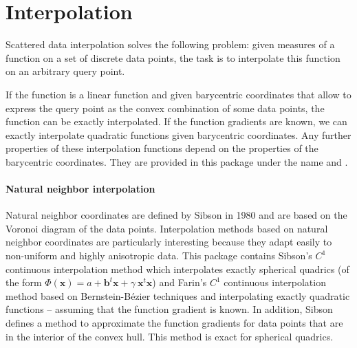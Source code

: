 
\chapter{Interpolation}
\label{chap:Interpolation}

Scattered data interpolation solves the following problem: given
measures of a function on a set of discrete data points, the task is
to interpolate this function on an arbitrary query point.

If the function is a linear function and given barycentric coordinates
that allow to express the query point as the convex combination of
some data points, the function can be exactly interpolated. If the
function gradients are known, we can exactly interpolate quadratic
functions given barycentric coordinates. Any further properties of
these interpolation functions depend on the properties of the
barycentric coordinates. They are provided in this package under the
name  and
.\medskip

\subsubsection{Natural neighbor interpolation} Natural neighbor
coordinates are defined by Sibson in 1980 and are based on the Voronoi
diagram of the data points. Interpolation methods based on natural
neighbor coordinates are particularly interesting because they adapt
easily to non-uniform and highly anisotropic data.  This package
contains Sibson's $C^1$ continuous interpolation method which
interpolates exactly spherical quadrics (of the form $\Phi(\mathbf{x})
=a + \mathbf{b}^t \mathbf{x} +\gamma\ \mathbf{x}^t\mathbf{x}$) and
Farin's $C^1$ continuous interpolation method based on
Bernstein-B\'ezier techniques and interpolating exactly quadratic
functions -- assuming that the function gradient is known. In
addition, Sibson defines a method to approximate the function
gradients for data points that are in the interior of the convex hull.
This
method is exact for spherical quadrics.%

